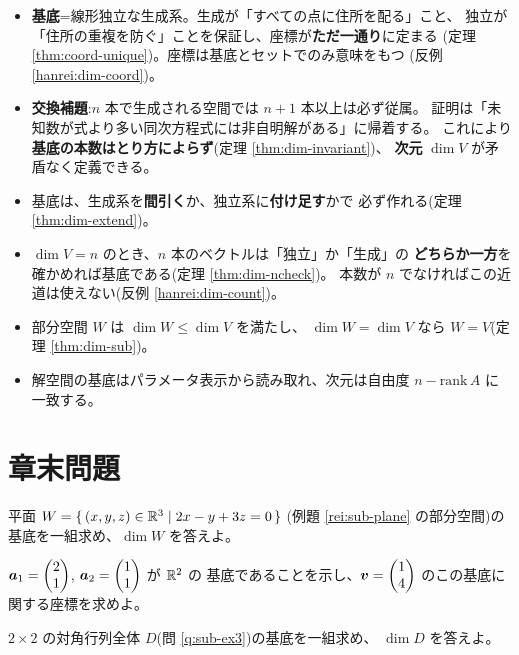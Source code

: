 \begin{matome}
\begin{itemize}
\item \textbf{基底}=線形独立な生成系。生成が「すべての点に住所を配る」こと、
独立が「住所の重複を防ぐ」ことを保証し、座標が\textbf{ただ一通り}に定まる
(定理 \ref{thm:coord-unique})。座標は基底とセットでのみ意味をもつ
(反例 \ref{hanrei:dim-coord})。
\item \textbf{交換補題}:$n$ 本で生成される空間では $n + 1$ 本以上は必ず従属。
証明は「未知数が式より多い同次方程式には非自明解がある」に帰着する。
これにより\textbf{基底の本数はとり方によらず}(定理 \ref{thm:dim-invariant})、
\textbf{次元} $\dim V$ が矛盾なく定義できる。
\item 基底は、生成系を\textbf{間引く}か、独立系に\textbf{付け足す}かで
必ず作れる(定理 \ref{thm:dim-extend})。
\item $\dim V = n$ のとき、$n$ 本のベクトルは「独立」か「生成」の
\textbf{どちらか一方}を確かめれば基底である(定理 \ref{thm:dim-ncheck})。
本数が $n$ でなければこの近道は使えない(反例 \ref{hanrei:dim-count})。
\item 部分空間 $W$ は $\dim W \le \dim V$ を満たし、
$\dim W = \dim V$ なら $W = V$(定理 \ref{thm:dim-sub})。
\item 解空間の基底はパラメータ表示から読み取れ、次元は自由度
$n - \mathrm{rank}\,A$ に一致する。
\end{itemize}
\end{matome}

\section*{章末問題}

\begin{mondai}[基本]\label{q:dim-ex1}
平面 $W = \{\,(x, y, z) \in \mathbb{R}^3 \mid 2x - y + 3z = 0\,\}$
(例題 \ref{rei:sub-plane} の部分空間)の基底を一組求め、$\dim W$ を答えよ。
\end{mondai}

\begin{mondai}[基本]\label{q:dim-ex2}
$\bm{a}_1 = \begin{pmatrix}2 \\ 1\end{pmatrix}$, $\bm{a}_2 = \begin{pmatrix}1 \\ 1\end{pmatrix}$ が $\mathbb{R}^2$ の
基底であることを示し、$\bm{v} = \begin{pmatrix}1 \\ 4\end{pmatrix}$ のこの基底に関する座標を求めよ。
\end{mondai}

\begin{mondai}[基本]\label{q:dim-ex3}
$2 \times 2$ の対角行列全体 $D$(問 \ref{q:sub-ex3})の基底を一組求め、
$\dim D$ を答えよ。
\end{mondai}

